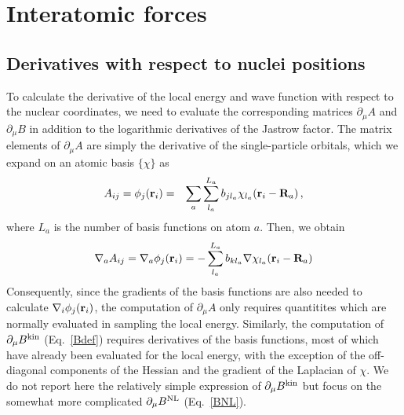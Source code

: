 \documentclass[aip,jcp,reprint,floatfix,onecolumn]{revtex4-1}
\begin{document}
\appendix

\section{Interatomic forces}
\label{App_force}

\subsection{Derivatives with respect to nuclei positions}

To calculate the derivative of the local energy and wave function with respect to the nuclear  coordinates,
we need to evaluate the corresponding matrices $\partial_\mu A$ and $\partial_\mu B$ in addition to the logarithmic derivatives of the Jastrow factor.
The matrix elements of $\partial_\mu A$ are simply
the derivative of the single-particle orbitals, which we expand on an atomic basis $\{\chi\}$ as
\begin{eqnarray}
A_{ij}=\phi_j({\bf r}_i)&=&\sum_a\sum_{l_a}^{L_a} b_{jl_a}\chi_{l_a}({\bf r}_i-{\bf R}_a)\,,
\label{orb}
\end{eqnarray}
where $L_a$ is the number of basis functions on atom $a$.  Then, we obtain
\begin{eqnarray}
\nabla_aA_{ij}=\nabla_a\phi_j({\bf r}_i)=-\sum_{l_a}^{L_a} b_{kl_a}\nabla \chi_{l_a}({\bf r}_i-{\bf R}_a)
\end{eqnarray}
Consequently, since the gradients of the basis functions are also needed to calculate $\nabla_i\phi_j({\bf r}_i)$, the
computation of $\partial_\mu A$ only requires quantitites which are normally evaluated in sampling the local energy.
Similarly, the computation of $\partial_\mu B^{\rm kin}$ (Eq.~\ref{Bdef}) requires derivatives of the basis functions, most of which have
already been evaluated for the local energy, with the exception of the off-diagonal components of the Hessian
and the gradient of the Laplacian of $\chi$.
We do not report here the relatively simple expression of $\partial_\mu B^{\rm kin}$ but focus on the somewhat more complicated $\partial_\mu B^{\rm NL}$ (Eq.~\ref{BNL}).
\end{document}
